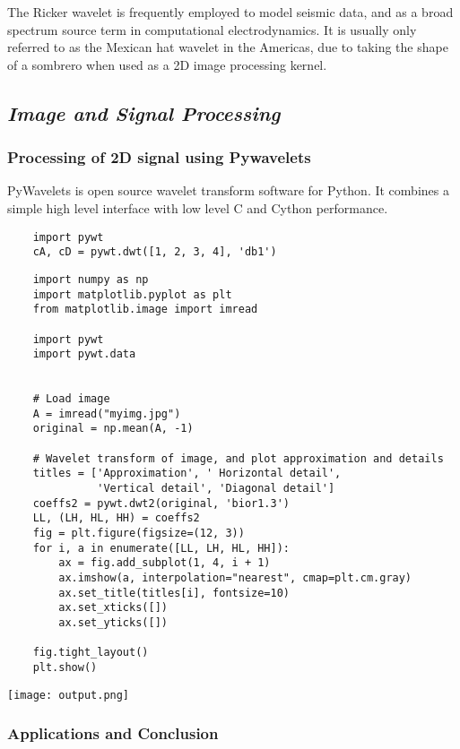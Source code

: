 \documentclass[12pt, a4paper]{article} %
\begin{document}
The Ricker wavelet is frequently employed to model seismic data, and as a broad spectrum source term in computational electrodynamics. It is usually only referred to as the Mexican hat wavelet in the Americas, due to taking the shape of a sombrero when used as a 2D image processing kernel.

\subsection{\slshape Image and Signal Processing}
\subsubsection{Processing of 2D signal using Pywavelets}

PyWavelets is open source wavelet transform software for Python. It combines a simple high level interface with low level C and Cython performance.


\begin{verbatim}
    import pywt
    cA, cD = pywt.dwt([1, 2, 3, 4], 'db1')
\end{verbatim}

\BgThispage
\begin{verbatim}
    import numpy as np
    import matplotlib.pyplot as plt
    from matplotlib.image import imread

    import pywt
    import pywt.data


    # Load image
    A = imread("myimg.jpg")
    original = np.mean(A, -1)

    # Wavelet transform of image, and plot approximation and details
    titles = ['Approximation', ' Horizontal detail',
              'Vertical detail', 'Diagonal detail'] 
    coeffs2 = pywt.dwt2(original, 'bior1.3')
    LL, (LH, HL, HH) = coeffs2
    fig = plt.figure(figsize=(12, 3))
    for i, a in enumerate([LL, LH, HL, HH]):
        ax = fig.add_subplot(1, 4, i + 1)
        ax.imshow(a, interpolation="nearest", cmap=plt.cm.gray)
        ax.set_title(titles[i], fontsize=10)
        ax.set_xticks([])
        ax.set_yticks([])
              
    fig.tight_layout()
    plt.show()          
\end{verbatim}

\texttt{[image: output.png]}
\BgThispage
\subsubsection{Applications and Conclusion}
\end{document}

